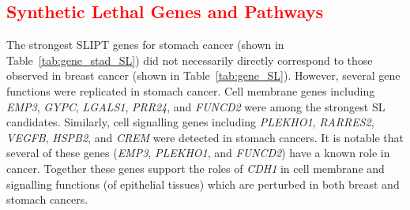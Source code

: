 \subsection{\textcolor{red}{Synthetic Lethal Genes and Pathways}} \label{chapt3:stad_SL_genes}

The strongest \gls{SLIPT} genes for stomach cancer (shown in Table~\ref{tab:gene_stad_SL}) did not necessarily directly correspond to those observed in breast cancer (shown in Table~\ref{tab:gene_SL}). However, several gene functions were replicated in stomach cancer. Cell membrane genes including \textit{EMP3}, \textit{GYPC},  \textit{LGALS1}, \textit{PRR24},  and \textit{FUNCD2} were among the strongest SL candidates. Similarly, cell signalling genes including \textit{PLEKHO1}, \textit{RARRES2}, \textit{VEGFB}, \textit{HSPB2}, and \textit{CREM} were detected in stomach cancers. It is notable that several of these genes (\textit{EMP3}, \textit{PLEKHO1}, and \textit{FUNCD2}) have a known role in cancer. Together these genes support the roles of \textit{CDH1} in cell membrane and signalling functions (of epithelial tissues) which are perturbed in both breast and stomach cancers.

